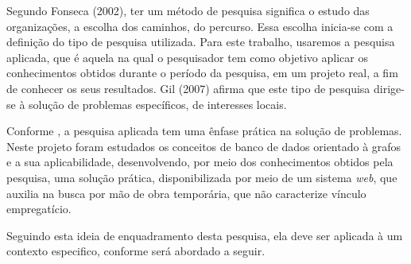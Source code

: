 \par Segundo Fonseca (2002), ter um método de pesquisa significa o estudo das organizações, a escolha dos caminhos, do percurso. Essa escolha inicia-se com a definição do tipo de pesquisa utilizada. Para este trabalho, usaremos a pesquisa aplicada, que é aquela na qual o pesquisador tem como objetivo aplicar os conhecimentos obtidos durante o período da pesquisa, em um projeto real, a fim de conhecer os seus resultados. Gil (2007) afirma que este tipo de pesquisa dirige-se à solução de problemas específicos, de interesses locais.

\par Conforme , a pesquisa aplicada tem uma ênfase prática na solução de problemas. Neste projeto foram estudados os conceitos de banco de dados orientado à grafos e a sua aplicabilidade, desenvolvendo, por meio dos conhecimentos obtidos pela pesquisa, uma solução prática, disponibilizada por meio de um sistema \textit{web}, que auxilia na busca por mão de obra temporária, que não caracterize vínculo empregatício.

\par Seguindo esta ideia de enquadramento desta pesquisa, ela deve ser aplicada à um contexto especifico, conforme será abordado a seguir. 




